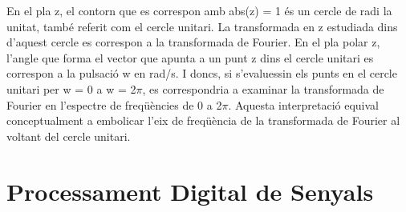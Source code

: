 \par En el pla z, el contorn que es correspon amb abs(z) = 1 és un cercle de radi la unitat, també referit com el cercle unitari. La transformada en z estudiada dins d'aquest cercle es correspon a la transformada de Fourier. En el pla polar z, l'angle que forma el vector que apunta a un punt z dins el cercle unitari es correspon a la pulsació w en rad/s. I doncs, si s'evaluessin els punts en el cercle unitari per w = 0 a w = 2$\pi$, es correspondria a examinar la transformada de Fourier en l'espectre de freqüències de 0 a 2$\pi$. Aquesta interpretació equival conceptualment a embolicar l'eix de freqüència de la transformada de Fourier al voltant del cercle unitari.

\section{Processament Digital de Senyals}
